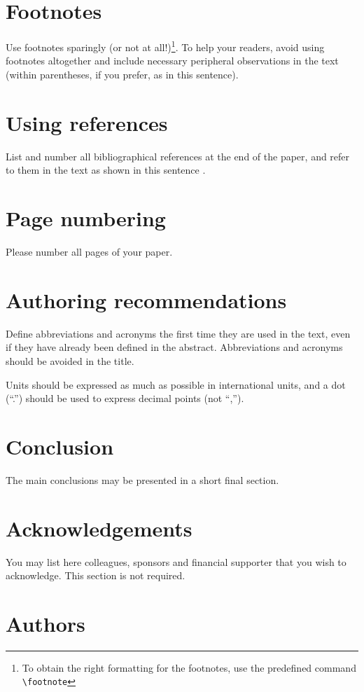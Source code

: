 \documentclass[10pt,a4paper,twocolumn]{article}
\begin{document}
\section{Footnotes}
\label{sec:sec7}
Use footnotes sparingly (or not at all!)\footnote{To obtain the right formatting for the footnotes, use the predefined command \texttt{\textbackslash{footnote}}}.
To help your readers, avoid using footnotes altogether and include necessary peripheral observations in the text (within parentheses, if you prefer, as in this sentence).


\section{Using references}
\label{sec:sec8}
List and number all bibliographical references at the end of the paper, and refer to them in the text as shown in this sentence \cite{wiegand2019WHO}.


\section{Page numbering}
\label{sec:sec9}
Please number all pages of your paper.


\section{Authoring recommendations}
\label{sec:sec10}
Define abbreviations and acronyms the first time they are used in the text, even if they have already been defined in the abstract.
Abbreviations and acronyms should be avoided in the title.

Units should be expressed as much as possible in international units, and a dot (``.'') should be used to express decimal points (not ``,'').


\section{Conclusion}
\label{sec:sec11}
The main conclusions may be presented in a short final section.


\section*{Acknowledgements}
\label{sec:ackn}
You may list here colleagues, sponsors and financial supporter that you wish to acknowledge.
This section is not required.


\printbibliography


\section*{Authors}
\label{sec:auth}
\end{document}
